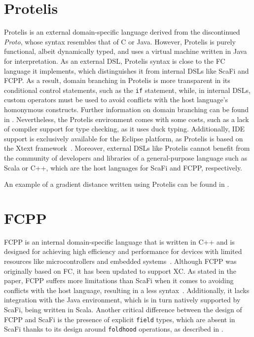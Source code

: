 \section{Protelis} \label{chap:state-of-the-art->sec:protelis}

Protelis is an external domain-specific language derived from the discontinued \textit{Proto}, whose syntax resembles that of C or Java.
%
However, Protelis is purely functional, albeit dynamically typed, and uses a virtual machine written in Java~\cite{protelis} for interpretation.
%
As an external \ac{DSL}, Protelis syntax is close to the \ac{FC} language it implements, which distinguishes it from internal \acp{DSL} like ScaFi and FCPP.
%
As a result, domain branching in Protelis is more transparent in its conditional control statements, such as the \texttt{if} statement, while, in internal DSLs, custom operators must be used to avoid conflicts with the host language's homonymous constructs. 
%
Further information on domain branching can be found in .
%
Nevertheless, the Protelis environment comes with some costs, such as a lack of compiler support for type checking, as it uses duck typing.
%
Additionally, IDE support is exclusively available for the Eclipse platform, as Protelis is based on the Xtext framework~\cite{xtext}.
%
Moreover, external \acp{DSL} like Protelis cannot benefit from the community of developers and libraries of a general-purpose language such as Scala or C++, which are the host languages for ScaFi and FCPP, respectively.

An example of a gradient distance written using Protelis can be found in .



\section{FCPP} \label{chap:state-of-the-art->sec:fcpp}

FCPP is an internal domain-specific language that is written in C++ and is designed for achieving high efficiency and performance for devices with limited resources like microcontrollers and embedded systems~\cite{fcpp}.
%
Although FCPP was originally based on \ac{FC}, it has been updated to support \ac{XC}.
%
As stated in the paper, FCPP suffers more limitations than ScaFi when it comes to avoiding conflicts with the host language, resulting in a less  syntax~\cite{fcpp}.
%
Additionally, it lacks integration with the Java environment, which is in turn natively supported by ScaFi, being written in Scala.
%
Another critical difference between the design of FCPP and ScaFi is the presence of explicit \texttt{field} types, which are absent in ScaFi thanks to its design around \texttt{foldhood} operations, as described in .

